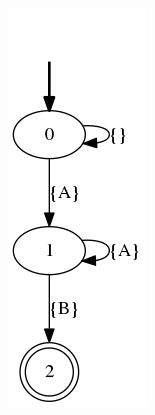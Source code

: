 \begin{example}
\begin{figure}[h!]
\begin{subfigure}[b]{0.2\textwidth}
			\includegraphics[width=\textwidth]{images/on-the-fly-example-eve/step6.png}

\end{subfigure}
\end{figure}
\end{example}

